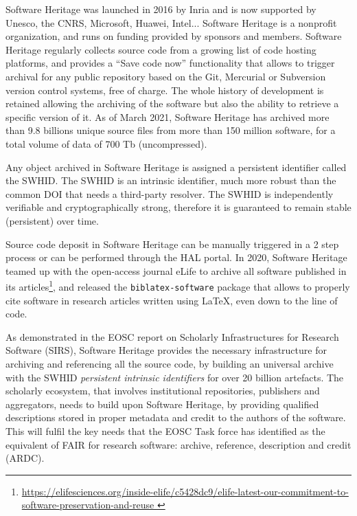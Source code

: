 \documentclass[long, final]{jobim}
\begin{document}
Software Heritage was launched in 2016 by Inria and is now supported by Unesco, the CNRS, Microsoft, Huawei, Intel... Software Heritage is a nonprofit organization, and runs on funding provided by sponsors and members. Software Heritage regularly collects source code from a growing list of code hosting platforms, and provides a “Save code now” functionality that allows to trigger archival for any public repository based on the Git, Mercurial or Subversion version control systems, free of charge. The whole history of development is retained allowing the archiving of the software but also the ability to retrieve a specific version of it. As of March 2021, Software Heritage has archived more than 9.8 billions unique source files from more than 150 million software, for a total volume of data of 700 Tb (uncompressed).

Any object archived in Software Heritage is assigned a persistent identifier called the SWHID\cite{dicosmo2020}. The SWHID is an intrinsic identifier, much more robust than the common DOI that needs a third-party resolver. The SWHID is independently verifiable and cryptographically strong, therefore it is guaranteed to remain stable (persistent) over time.

Source code deposit in Software Heritage can be manually triggered in a 2 step process or can be performed through the HAL portal\cite{barborini2018}. In 2020, Software Heritage teamed up with the open-access journal eLife to archive all software published in its articles\footnote{\url{https://elifesciences.org/inside-elife/c5428dc9/elife-latest-our-commitment-to-software-preservation-and-reuse }}, and released the \texttt{biblatex-software} package\cite{biblatex-software} that allows to properly cite software in research articles written using LaTeX, even down to the line of code\cite{dicosmo2020}.

As demonstrated in the EOSC report on Scholarly Infrastructures for Research Software (SIRS)\cite{SIRSReport2020}, Software Heritage provides the necessary infrastructure for archiving and referencing all the source code, by building an universal archive with the SWHID \textit{persistent intrinsic identifiers} for over 20 billion artefacts. The scholarly ecosystem, that involves institutional repositories, publishers and aggregators, needs to build upon Software Heritage, by providing qualified descriptions stored in proper metadata and credit to the authors of the software. This will fulfil the key needs that the EOSC Task force has identified as the equivalent of FAIR for research software: archive, reference, description and credit (ARDC). 
\end{document}
